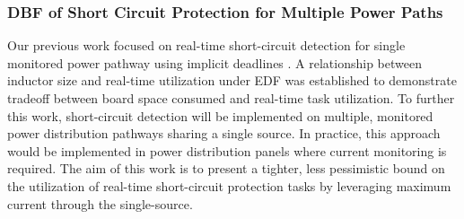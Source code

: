 \subsubsection{DBF of Short Circuit Protection for Multiple Power Paths}

Our previous work focused on real-time short-circuit detection for single monitored power pathway using implicit deadlines \cite{willcock_trading_2017}.
A relationship between inductor size and real-time utilization under EDF was established to demonstrate tradeoff between board space consumed and real-time task utilization.
To further this work, short-circuit detection will be implemented on multiple, monitored power distribution pathways sharing a single source.
In practice, this approach would be implemented in power distribution panels where current monitoring is required.
The aim of this work is to present a tighter, less pessimistic bound on the utilization of real-time short-circuit protection tasks by leveraging maximum current through the single-source.

